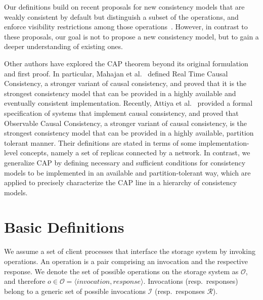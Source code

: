\documentclass[journal,compsoc]{IEEEtran}
\begin{document}
Our definitions build on recent proposals for new consistency models that are weakly consistent by default but distinguish a subset of the operations, and enforce visibility restrictions among those operations~\cite{Li:2012:MGS:2387880.2387906, Gotsman:2016:CIS:2837614.2837625, cheng-papoc}. However, in contrast to these proposals, our goal is not to propose a new consistency model, but to gain a deeper understanding of existing ones.





Other authors have explored the CAP theorem beyond its original formulation and first proof. 
In particular, Mahajan et al.~\cite{mahajan11cacTR} defined Real Time Causal Consistency, a stronger variant of causal consistency, and proved that it is the strongest consistency model that can be provided in a highly available and eventually consistent implementation.  
Recently, Attiya et al.~\cite{Attiya:2015:LHE:2767386.2767419}  provided a formal specification of systems that implement causal consistency, and proved that Observable Causal Consistency, a stronger variant of causal consistency, is the strongest consistency model that can be provided in a highly available, partition tolerant manner. Their definitions are stated in terms of some implementation-level concepts, namely a set of replicas connected by a network.
In contrast, we generalize CAP by defining necessary and sufficient conditions for consistency models to be implemented in an available and partition-tolerant way, which are applied to precisely characterize the CAP line in a hierarchy of consistency models.

  \section{Basic Definitions} \label{sec:definitions}



We assume a set of client processes that interface the storage system by invoking operations. An operation is a pair comprising an invocation and the respective response. We denote the set of possible operations on the storage system as $\mathcal{O}$, and therefore $o \in \mathcal{O} = \langle \textit{invocation},\textit{response}\rangle$. Invocations (resp.\ responses) belong to a generic set of possible invocations $\mathcal{I}$ (resp.\ responses $\mathcal{R}$).
\end{document}
